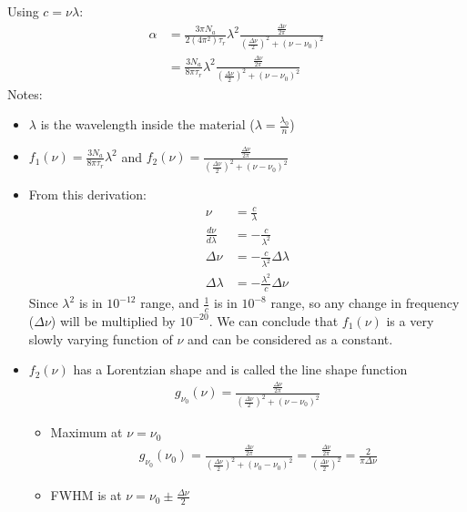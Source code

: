 \documentclass[11pt]{article}
\begin{document}
Using $c = \nu \lambda$:
\begin{align*}
    \alpha &= \frac{3 \pi N_a}{2 (4 \pi^2) \tau_r} \lambda^2 \frac{\frac{\Delta \nu}{2 \pi}}{(\frac{\Delta \nu}{2})^2 + (\nu - \nu_0)^2} \\
    &= \frac{3 N_a}{8 \pi \tau_r} \lambda^2 \frac{\frac{\Delta \nu}{2 \pi}}{(\frac{\Delta \nu}{2})^2 + (\nu - \nu_0)^2}
\end{align*}
Notes:
\begin{itemize}
    \item $\lambda$ is the wavelength inside the material ($\lambda = \frac{\lambda_0}{n}$)
    \item $f_1(\nu) = \frac{3 N_a}{8 \pi \tau_r} \lambda^2$ and $f_2(\nu) = \frac{\frac{\Delta \nu}{2 \pi}}{(\frac{\Delta \nu}{2})^2 + (\nu - \nu_0)^2}$
    \item From this derivation:
        \begin{align*}
            \nu &= \frac{c}{\lambda} \\
            \frac{d \nu}{d \lambda} &= -\frac{c}{\lambda^2} \\
            \Delta \nu &= -\frac{c}{\lambda^2} \Delta \lambda \\
            \Delta \lambda &= -\frac{\lambda^2}{c} \Delta \nu
        \end{align*}
        Since $\lambda^2$ is in $10^{-12}$ range, and $\frac{1}{c}$ is in $10^{-8}$ range, so any change in frequency ($\Delta \nu$) will be multiplied by $10^{-20}$. We can conclude that $f_1(\nu)$ is a very slowly varying function of $\nu$ and can be considered as a constant.
    \item $f_2(\nu)$ has a Lorentzian shape and is called the line shape function
    \begin{align*}
        g_{\nu_0}(\nu) = \frac{\frac{\Delta \nu}{2 \pi}}{(\frac{\Delta \nu}{2})^2 + (\nu - \nu_0)^2}
    \end{align*}
        \begin{itemize}
            \item Maximum at $\nu = \nu_0$
                \begin{align*}
                    g_{\nu_0}(\nu_0) = \frac{\frac{\Delta \nu}{2 \pi}}{(\frac{\Delta \nu}{2})^2 + (\nu_0 - \nu_0)^2} = \frac{\frac{\Delta \nu}{2 \pi}}{(\frac{\Delta \nu}{2})^2} = \frac{2}{\pi \Delta \nu}
                \end{align*}
            \item FWHM is at $\nu = \nu_0 \pm \frac{\Delta \nu}{2}$
                \begin{align*}

\end{align*}
\end{itemize}
\end{itemize}
\end{document}

